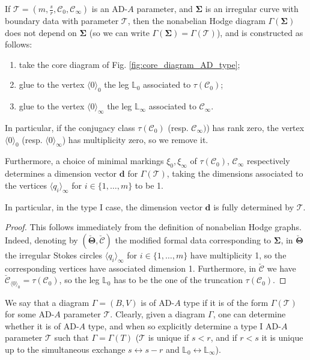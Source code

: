 \documentclass[11pt,a4paper]{amsart}
\numberwithin{equation}{section}
\newcommand{\cir}[1]{\langle #1 \rangle}
\begin{document}
\begin{lemma}
If $\mathcal T=(m, \frac{s}{r}, \mathcal C_0, \mathcal C_\infty)$ is an AD-$A$ parameter, and $\bm\Sigma$ is an irregular curve with boundary data with parameter $\mathcal T$, then the nonabelian Hodge diagram $\Gamma(\bm\Sigma)$ does not depend on $\bm\Sigma$ (so we can write $\Gamma(\bm\Sigma)=\Gamma(\mathcal T)$), and is constructed as follows:
\begin{enumerate}
\item take the core diagram of Fig. \ref{fig:core_diagram_AD_type};
\item glue to the vertex $\cir{0}_0$
the leg $\mathbb L_0$ associated to $\tau(\mathcal C_0)$;
\item glue to the vertex $\cir{0}_\infty$ the leg $\mathbb L_\infty$ associated to $\mathcal C_\infty$.
\end{enumerate}
In particular, if the conjugacy class $\tau(\mathcal C_0)$ (resp. $\mathcal C_\infty)$) has rank zero, the vertex $\cir{0}_0$ (resp. $\cir{0}_\infty$) has multiplicity zero, so we remove it.

Furthermore, a choice of minimal markings $\xi_0, \xi_\infty$ of $\tau(\mathcal C_0)$, $\mathcal C_\infty$ respectively determines a dimension vector $\mathbf d$ for $\Gamma(\mathcal T)$, taking the dimensions associated to the vertices $\cir{q_i}_\infty$ for $i\in \{1, \dots, m\}$ to be 1. 
\end{lemma}

In particular, in the type I case, the dimension vector $\mathbf d$ is fully determined by $\mathcal T$.

\begin{proof}
This follows immediately from the definition of nonabelian Hodge graphs. Indeed, denoting by $(\bm{\breve\Theta}, \bm{\breve{\mathcal C}})$ the modified formal data corresponding to $\bm\Sigma$, in $\breve{\bm\Theta}$ the irregular Stokes circles $\cir{q_i}_\infty$ for $i\in \{1, \dots, m\}$ have multiplicity 1, so the corresponding vertices have associated dimension 1. Furthermore, in $\bm{\breve{\mathcal C}}$ we have $\bm{\breve{\mathcal C}}_{\cir{0}_0}=\tau(\mathcal C_0)$, so the leg $\mathbb L_0$ has to be the one of the truncation $\tau(\mathcal C_0)$. 
\end{proof}



We say that a diagram $\Gamma=(B,V)$ is of AD-$A$ type if it is of the form $\Gamma(\mathcal T)$ for some AD-$A$ parameter $\mathcal T$. Clearly, given a diagram $\Gamma$, one can  determine whether it is of AD-$A$ type, and when so explicitly determine a type I AD-$A$ parameter $\mathcal T$ such that $\Gamma=\Gamma(T)$ ($\mathcal T$ is unique if $s<r$, and if $r<s$ it is unique up to the simultaneous exchange   $s\leftrightarrow s-r$ and $\mathbb L_0\leftrightarrow \mathbb L_\infty$). 
\end{document}
